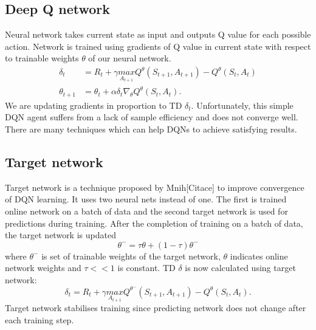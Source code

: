 \subsection{Deep Q network}
Neural network takes current state as input and outputs Q value for each possible action. Network is trained using gradients of Q value in current state with respect to trainable weights $\theta$ of our neural network.
\begin{align}
\delta_t &= R_{t} + \gamma \underset{A_{t+1}}{max}Q^\theta(S_{t+1}, A_{t+1}) - Q^\theta(S_t, A_t)\\
\theta_{t+1} &= \theta_t + \alpha \delta_t \nabla_\theta Q^\theta (S_t, A_t).
\end{align}
We are updating gradients in proportion to TD $\delta_t$. Unfortunately, this simple DQN agent suffers from a lack of sample efficiency and does not converge well. There are many techniques which can help DQNs to achieve satisfying results.

\subsection{Target network}
Target network is a technique proposed by Mnih[Citace] to improve convergence of DQN learning. It uses two neural nets instead of one. The first is trained online network on a batch of data and the second target network is used for predictions during training. After the completion of training on a batch of data, the target network is updated
\begin{equation}
\theta^- = \tau \theta + (1-\tau)\theta^-
\end{equation}
where $\theta^-$ is set of trainable weights of the target network, $\theta$ indicates online network weights and $\tau << 1$ is constant.
TD $\delta$ is now calculated using target network:
\begin{equation}
\delta_t = R_{t} + \gamma \underset{A_{t+1}}{max}Q^{\theta^-}(S_{t+1}, A_{t+1}) - Q^\theta(S_t, A_t). 
\end{equation}
Target network stabilises training since predicting network does not change after each training step.

